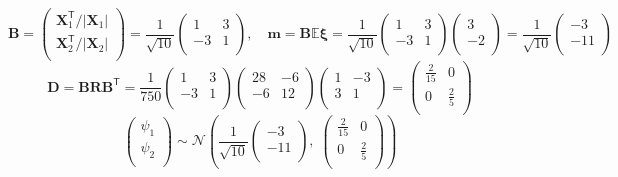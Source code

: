 \documentclass[12pt]{spbstu-task}
\begin{document}
\begin{displaymath}
  \mathbf{B} = \begin{pmatrix}
    \mathbf{X}_1^\mathsf{T}/|\mathbf{X}_1| \\
    \mathbf{X}_2^\mathsf{T}/|\mathbf{X}_2| \\
  \end{pmatrix} = \frac{1}{\sqrt{10}}\begin{pmatrix}
    1 & 3 \\
    -3 & 1 \\
  \end{pmatrix},\quad
  \mathbf{m} = \mathbf{B}\mathbb{E}\boldsymbol{\xi} =
  \frac{1}{\sqrt{10}}\begin{pmatrix}
    1 & 3 \\
    -3 & 1 \\
  \end{pmatrix}\begin{pmatrix}
    3 \\
    -2 \\
  \end{pmatrix} = \frac{1}{\sqrt{10}}\begin{pmatrix}
    -3 \\
    -11 \\
  \end{pmatrix}
\end{displaymath}
\begin{displaymath}
  \mathbf{D} = \mathbf{B}\mathbf{R}\mathbf{B}^\mathsf{T} =
  \frac{1}{750}\begin{pmatrix}
    1 & 3 \\
    -3 & 1 \\
  \end{pmatrix}\begin{pmatrix}
    28 & -6 \\
    -6 & 12 \\
  \end{pmatrix}\begin{pmatrix}
    1 & -3 \\
    3 & 1 \\
  \end{pmatrix} = \begin{pmatrix}
    \frac{2}{15} & 0 \\
    0 & \frac{2}{5} \\
  \end{pmatrix}
\end{displaymath}
\begin{displaymath}
  \begin{pmatrix}
    \psi_1 \\
    \psi_2 \\
  \end{pmatrix} \sim \mathcal{N}\left(\frac{1}{\sqrt{10}}\begin{pmatrix}
    -3 \\ -11 \\
  \end{pmatrix},\;\begin{pmatrix}
    \frac{2}{15} & 0 \\
    0 & \frac{2}{5} \\
  \end{pmatrix}\right)
\end{displaymath}
\end{document}
